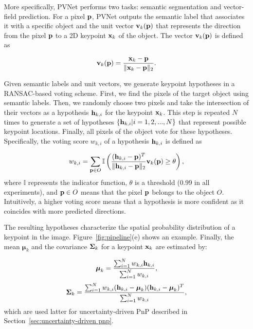 \documentclass[10pt,twocolumn,letterpaper]{article}
\begin{document}
More specifically, PVNet performs two tasks: semantic segmentation and vector-field prediction. For a pixel ${\bf p}$, PVNet outputs the semantic label that associates it with a specific object and the unit vector ${\bf v}_k({\bf p})$ that represents the direction from the pixel $\bf p$ to a 2D keypoint ${\bf x}_k$ of the object. The vector ${\bf v}_k({\bf p})$ is defined as

\begin{equation}
    {\bf v}_k({\bf p}) =  \frac{{\bf x}_k - {\bf p}}{\|{\bf x}_k - {\bf p}\|_2}.
\end{equation}%

Given semantic labels and unit vectors, we generate keypoint hypotheses in a RANSAC-based voting scheme. First, we find the pixels of the target object using semantic labels. Then, we randomly choose two pixels and take the intersection of their vectors as a hypothesis ${\bf h}_{k,i}$ for the keypoint ${\bf x}_k$. This step is repeated $N$ times to generate a set of hypotheses $\{{\bf h}_{k,i} |i = 1,2,...,N\}$ that represent possible keypoint locations. Finally, all pixels of the object vote for these hypotheses. Specifically, the voting score $w_{k,i}$ of a hypothesis ${\bf h}_{k,i}$ is defined as

\begin{equation}
	w_{k,i} = \sum\limits_{{\bf p}\in O} \mathbb{I} \left( \frac{({\bf h}_{k,i} - {\bf p})^T}{\|{\bf h}_{k,i} - {\bf p}\|_2} {\bf v}_k({\bf p}) \ge \theta \right),
\end{equation}
where $\mathbb{I}$ represents the indicator function, $\theta$ is a threshold (0.99 in all experiments), and ${\bf p} \in O$ means that the pixel $\bf p$ belongs to the object $O$. Intuitively, a higher voting score means that a hypothesis is more confident as it coincides with more predicted directions.

The resulting hypotheses characterize the spatial probability distribution of a keypoint in the image. Figure~\ref{fig:pipeline}(e) shows an example.  
Finally, the mean ${\boldsymbol \mu_k}$ and the covariance ${\bf \Sigma}_k$ for a keypoint ${\bf x}_k$ are estimated by:

\begin{equation}{\bf \boldsymbol\mu}_k = \frac{ \sum_{i=1}^{N} w_{k,i}{\bf h}_{k,i}}{\sum_{i=1}^{N} w_{k,i}},
\end{equation}\begin{equation}{\bf \Sigma}_k = \frac{\sum_{i=1}^{N} w_{k,i}({\bf h}_{k,i} - {\bf \boldsymbol\mu}_k)({\bf h}_{k,i} - {\bf \boldsymbol\mu}_k)^T}{\sum_{i=1}^{N} w_{k,i}},
\end{equation}
which are used latter for uncertainty-driven PnP described in Section~\ref{sec:uncertainty-driven pnp}.
\end{document}
